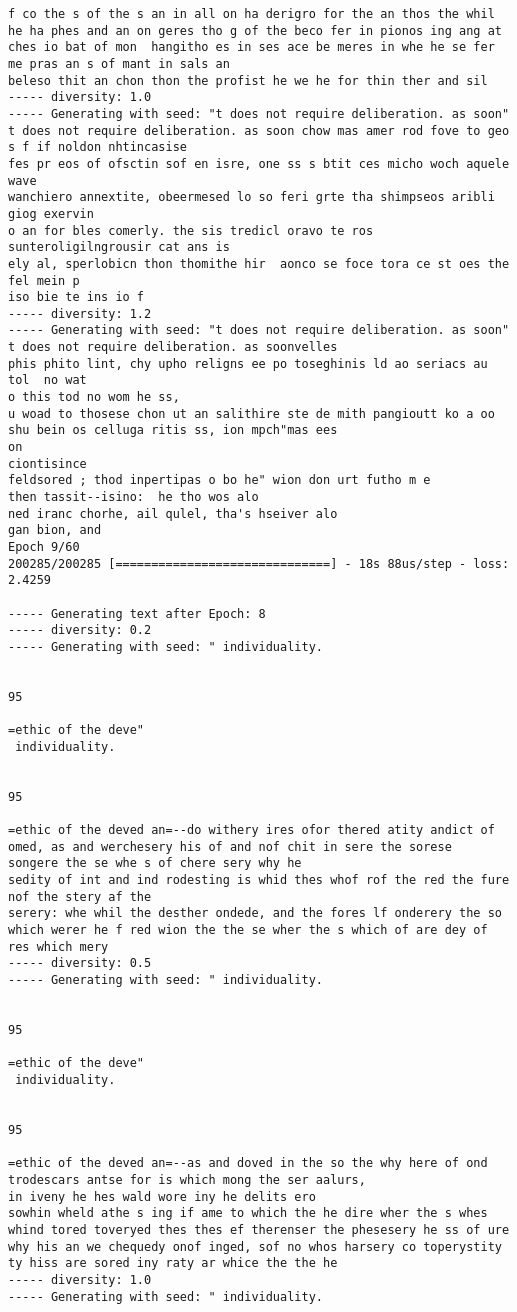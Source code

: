\documentclass[11pt]{article}
\begin{document}
\begin{Verbatim}[commandchars=\\\{\}]
f co the s of the s an in all on ha derigro for the an thos the whil  he ha phes and an on geres tho g of the beco fer in pionos ing ang at ches io bat of mon  hangitho es in ses ace be meres in whe he se fer me pras an s of mant in sals an
beleso thit an chon thon the profist he we he for thin ther and sil
----- diversity: 1.0
----- Generating with seed: "t does not require deliberation. as soon"
t does not require deliberation. as soon chow mas amer rod fove to geo
s f if noldon nhtincasise
fes pr eos of ofsctin sof en isre, one ss s btit ces micho woch aquele wave
wanchiero annextite, obeermesed lo so feri grte tha shimpseos aribli giog exervin
o an for bles comerly. the sis tredicl oravo te ros sunteroligilngrousir cat ans is
ely al, sperlobicn thon thomithe hir  aonco se foce tora ce st oes the fel mein p
iso bie te ins io f
----- diversity: 1.2
----- Generating with seed: "t does not require deliberation. as soon"
t does not require deliberation. as soonvelles
phis phito lint, chy upho religns ee po toseghinis ld ao seriacs au tol  no wat
o this tod no wom he ss,
u woad to thosese chon ut an salithire ste de mith pangioutt ko a oo shu bein os celluga ritis ss, ion mpch"mas ees
on
ciontisince
feldsored ; thod inpertipas o bo he" wion don urt futho m e
then tassit--isino:  he tho wos alo
ned iranc chorhe, ail qulel, tha's hseiver alo
gan bion, and 
Epoch 9/60
200285/200285 [==============================] - 18s 88us/step - loss: 2.4259

----- Generating text after Epoch: 8
----- diversity: 0.2
----- Generating with seed: " individuality.


95

=ethic of the deve"
 individuality.


95

=ethic of the deved an=--do withery ires ofor thered atity andict of omed, as and werchesery his of and nof chit in sere the sorese
songere the se whe s of chere sery why he
sedity of int and ind rodesting is whid thes whof rof the red the fure nof the stery af the
serery: whe whil the desther ondede, and the fores lf onderery the so which werer he f red wion the the se wher the s which of are dey of
res which mery
----- diversity: 0.5
----- Generating with seed: " individuality.


95

=ethic of the deve"
 individuality.


95

=ethic of the deved an=--as and doved in the so the why here of ond trodescars antse for is which mong the ser aalurs,
in iveny he hes wald wore iny he delits ero
sowhin wheld athe s ing if ame to which the he dire wher the s whes whind tored toveryed thes thes ef therenser the phesesery he ss of ure
why his an we chequedy onof inged, sof no whos harsery co toperystity ty hiss are sored iny raty ar whice the the he
----- diversity: 1.0
----- Generating with seed: " individuality.



\end{Verbatim}
\end{document}
